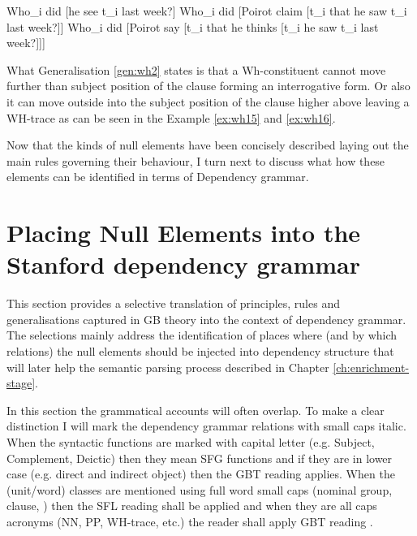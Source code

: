 \begin{exe}
	\ex\label{ex:wh14} Who_{i} did [he see t_{i} last week?]
	\ex\label{ex:wh15} Who_{i} did [Poirot claim [t_{i} that he saw t_{i} last week?]]
	\ex\label{ex:wh16} Who_{i} did [Poirot say [t_{i} that he thinks [t_{i} he saw t_{i} last week?]]]
\end{exe}

What Generalisation \ref{gen:wh2} states is that a Wh-constituent cannot move further than subject position of the clause forming an interrogative form. Or also it can move outside into the subject position of the clause higher above leaving a WH-trace as can be seen in the Example \ref{ex:wh15} and \ref{ex:wh16}.

Now that the kinds of null elements have been concisely described laying out the main rules governing their behaviour, I turn next to discuss what how these elements can be identified in terms of Dependency grammar. 

\section{Placing Null Elements into the Stanford dependency grammar}
\label{sec:placing-null-elements}

This section provides a selective translation of principles, rules and generalisations captured in GB theory into the context of dependency grammar. The selections mainly address the identification of places where (and by which relations) the null elements should be injected into dependency structure that will later help the semantic parsing process described in Chapter \ref{ch:enrichment-stage}. 

In this section the grammatical accounts will often overlap. To make a clear distinction I will mark the dependency grammar relations with small caps italic. When the syntactic functions are marked with capital letter (e.g. Subject, Complement, Deictic) then they mean SFG functions and if they are in lower case (e.g. direct and indirect object) then the GBT reading applies. When the (unit/word) classes are mentioned using full word small caps (nominal group, clause, ) then the SFL reading shall be applied and when they are all caps acronyms (NN, PP, WH-trace, etc.) the reader shall apply GBT reading .

